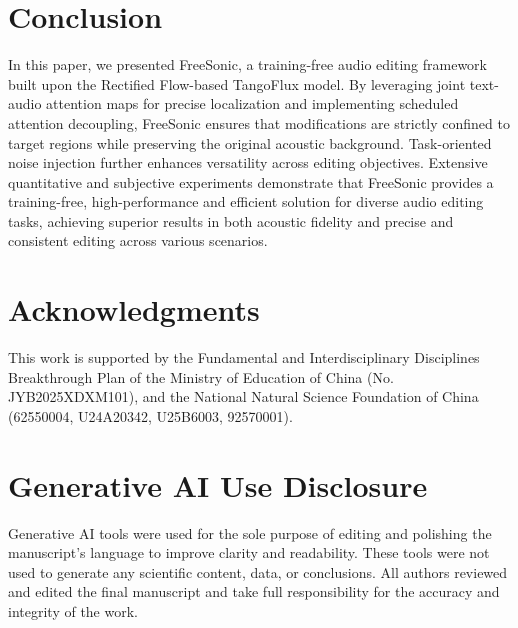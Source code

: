\section{Conclusion}
In this paper, we presented FreeSonic, a training-free audio editing framework built upon the Rectified Flow-based TangoFlux model. By leveraging joint text-audio attention maps for precise localization and implementing scheduled attention decoupling, FreeSonic ensures that modifications are strictly confined to target regions while preserving the original acoustic background. Task-oriented noise injection further enhances versatility across editing objectives.
Extensive quantitative and subjective experiments demonstrate that FreeSonic provides a training-free, high-performance and efficient solution for diverse audio editing tasks, achieving superior results in both acoustic fidelity and precise and consistent editing across various scenarios.

\section{Acknowledgments}
This work is supported by the Fundamental and Interdisciplinary Disciplines Breakthrough Plan of the Ministry of Education of China (No. JYB2025XDXM101), and the National Natural Science Foundation of China (62550004, U24A20342, U25B6003, 92570001).

\section{Generative AI Use Disclosure}
Generative AI tools were used for the sole purpose of editing and polishing the manuscript's language to improve clarity and readability. These tools were not used to generate any scientific content, data, or conclusions. All authors reviewed and edited the final manuscript and take full responsibility for the accuracy and integrity of the work.
